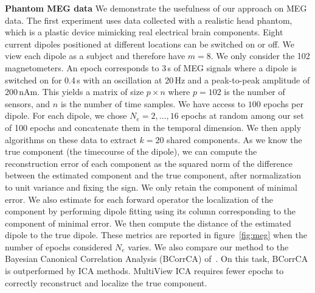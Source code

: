 \textbf{Phantom MEG data}
We demonstrate the usefulness of our approach on MEG data.
%
The first experiment uses data collected with a realistic head phantom, which is a plastic device mimicking real electrical brain components.
%
Eight current dipoles positioned at different locations can be switched on or off.
%
We view each dipole as a subject and therefore have $m=8$.
%
We only consider the 102 magnetometers.
%
An epoch corresponds to 3\,s of MEG signals where a dipole is switched on for 0.4\,s with an oscillation at 20\,Hz and a peak-to-peak amplitude of 200\,nAm.
%
This yields a matrix of size $p\times n$ where $p=102$ is the number of sensors, and $n$ is the number of time samples.
%
We have access to $100$ epochs per dipole.
%
For each dipole, we chose $N_e=2, \dots, 16$ epochs at random among our set of 100 epochs and concatenate them in the temporal dimension.
%
We then apply algorithms on these data to extract $k=20$ shared components.
%
As we know the true component (the timecourse of the dipole), we can compute the reconstruction error of each component as the squared norm of the difference between the estimated component and the true component, after normalization to unit variance and fixing the sign.
%
We only retain the component of minimal error.
%
We also estimate for each forward operator the localization of the component by performing dipole fitting using its column corresponding to the component of minimal error.
%
We then compute the distance of the estimated dipole to the true dipole.
%
These metrics are reported in figure~\ref{fig:meg} when the number of epochs considered $N_e$ varies.
%
We also compare our method to the Bayesian Canonical Correlation Analysis (BCorrCA) of~\cite{kamronn2015multiview}.
%
On this task, BCorrCA is outperformed by ICA methods.
%
MultiView ICA requires fewer epochs to correctly reconstruct and localize the true component.
%

